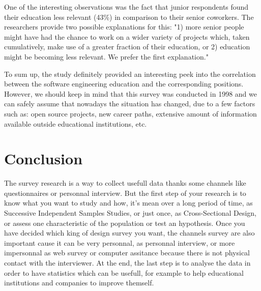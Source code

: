 \documentclass{report}
\begin{document}
One of the interesting observations was the fact that junior respondents found their education less relevant (43\%) in comparison to their senior coworkers. The researchers provide two possible explanations for this: "1) more senior people might have had the chance to work on a wider variety of projects which, taken cumulatively, make use of a greater fraction of their education, or 2) education might be becoming less relevant. We prefer the first explanation." \cite{lethbridge}

To sum up, the study definitely provided an interesting peek into the correlation between the software engineering education and the corresponding positions. However, we should keep in mind that this survey was conducted in 1998 and we can safely assume that nowadays the situation has changed, due to a few factors such as: open source projects, new career paths, extensive amount of information available outside educational institutions, etc.

\chapter{Conclusion}
The survey research is a way to collect usefull data thanks some channels like questionnaires or personnal interview. But the first step of your research is to know what you want to study and how, it's mean over a long period of time, as Successive Independent Samples Studies, or just once, as Cross-Sectional Design, or assess one characteristic of the population or test an hypothesis.
Once you have decided which king of design survey you want, the channels survey are also important cause it can be very personnal, as personnal interview, or more impersonnal as web survey or computer assitance because there is not physical contact with the interviewer.
At the end, the last step is to analyse the data in order to have statistics which can be usefull, for example to help educational institutions and companies to improve themself.

{}

\end{document}
